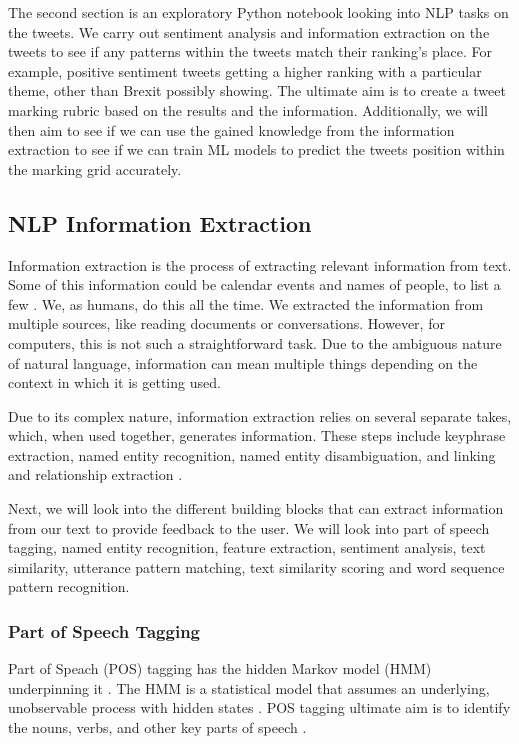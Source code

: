 	The second section is an exploratory Python notebook looking into NLP tasks on the tweets. We carry out sentiment analysis and information extraction on the tweets to see if any patterns within the tweets match their ranking's place. For example, positive sentiment tweets getting a higher ranking with a particular theme, other than Brexit possibly showing. The ultimate aim is to create a tweet marking rubric based on the results and the information. Additionally, we will then aim to see if we can use the gained knowledge from the information extraction to see if we can train ML models to predict the tweets position within the marking grid accurately.
	
	\subsection{NLP Information Extraction}
	Information extraction is the process of extracting relevant information from text. Some of this information could be calendar events and names of people, to list a few \cite{vajjala2020practical}. We, as humans, do this all the time. We extracted the information from multiple sources, like reading documents or conversations. However, for computers, this is not such a straightforward task. Due to the ambiguous nature of natural language, information can mean multiple things depending on the context in which it is getting used.
	
	Due to its complex nature, information extraction relies on several separate takes, which, when used together, generates information. These steps include keyphrase extraction, named entity recognition, named entity disambiguation, and linking and relationship extraction \cite{vajjala2020practical}.
	
	Next, we will look into the different building blocks that can extract information from our text to provide feedback to the user. We will look into part of speech tagging, named entity recognition, feature extraction, sentiment analysis, text similarity, utterance pattern matching, text similarity scoring and word sequence pattern recognition.
	
	\subsubsection{Part of Speech Tagging}
	Part of Speach (POS) tagging has the hidden Markov model (HMM) underpinning it \cite{vajjala2020practical}. The HMM is a statistical model that assumes an underlying, unobservable process with hidden states \cite{baum1966statistical}. POS tagging ultimate aim is to identify the nouns, verbs, and other key parts of speech \cite{vasiliev2020natural}.
	
